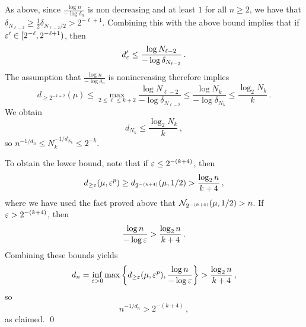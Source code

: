 As above, since $\frac{\log n}{- \log \delta_n}$ is non decreasing and at least $1$ for all $n \geq 2$, we have that $\delta_{N_{\ell-2}} \geq \frac 1 2 \delta_{N_{\ell-2}/2} > 2^{-\ell + 1}$.
Combining this with the above bound implies that if $\varepsilon' \in [2^{-\ell}, 2^{-\ell +1})$, then
\begin{equation*}
d_\varepsilon' \leq \frac{\log N_{\ell - 2}}{- \log \delta_{N_{\ell -2}}}\,.
\end{equation*}
The assumption that $\frac{\log n}{- \log \delta_n}$ is nonincreasing therefore implies
\begin{equation*}
d_{\geq 2^{-{k+2}}}(\mu) \leq \max_{2 \leq \ell \leq k+2} \frac{\log N_{\ell - 2}}{- \log \delta_{N_{\ell -2}}} \leq \frac{\log N_k}{- \log \delta_{N_k}} \leq \frac{\log_2 N_k}{k}\,.
\end{equation*}
We obtain
\begin{equation*}
d_{N_k} \leq \frac{\log_2 N_k}{k}\,,
\end{equation*}
so $n^{-1/d_n} \leq N_k^{-1/d_{N_k}} \leq 2^{-k}$.

To obtain the lower bound, note that if $\varepsilon \leq 2^{-(k+4)}$, then
\begin{equation*}
d_{\geq \varepsilon}(\mu, \varepsilon^p) \geq d_{2^{-(k+4)}}(\mu, 1/2) > \frac{\log_2 n}{k+4}\,,
\end{equation*}
where we have used the fact proved above that $\mathcal{N}_{2^{-(k+4)}}(\mu, 1/2) > n$.
If $\varepsilon > 2^{-(k+4)}$, then
\begin{equation*}
\frac{\log n}{- \log \varepsilon} > \frac{\log_2 n}{k+4}\,.
\end{equation*}
Combining these bounds yields
\begin{equation*}
d_n = \inf_{\varepsilon > 0} \max \left\{d_{\geq \varepsilon}(\mu, \varepsilon^p), \frac{\log n}{- \log \varepsilon}\right\} > \frac{\log_2 n}{k+4}\,,
\end{equation*}
so
\begin{equation*}
n^{-1/d_n} > 2^{-(k+4)}\,,
\end{equation*}
as claimed.
\qed

